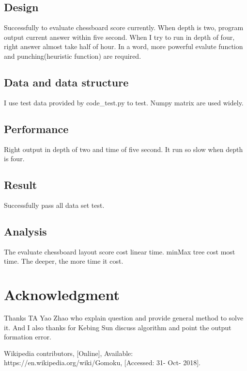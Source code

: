 \documentclass[conference,compsoc]{IEEEtran}
\begin{document}
\subsection{Design}
Successfully to evaluate chessboard score currently. When depth is two, program
output current answer within five second. When I try to run in depth of four,
right answer almost take half of hour. In a word, more powerful evalute
function and punching(heuristic function) are required.

\subsection{Data and data structure}
I use test data provided by code\_test.py to test. Numpy matrix are used widely.

\subsection{Performance}
Right output in depth of two and time of five second. It run so slow when
depth is four.

\subsection{Result}
Successfully pass all data set test.

\subsection{Analysis}
The evaluate chessboard layout score cost linear time. minMax tree cost most
time. The deeper, the more time it cost.

\section*{Acknowledgment}
Thanks TA Yao Zhao who explain question and provide general method to solve it.
And I also thanks for Kebing Sun discuss algorithm and point the output
formation error.


\begin{thebibliography}{1}
Wikipedia contributors, [Online], Available: https://en.wikipedia.org/wiki/Gomoku,
[Accessed: 31- Oct- 2018].
\end{thebibliography}

\end{document}
